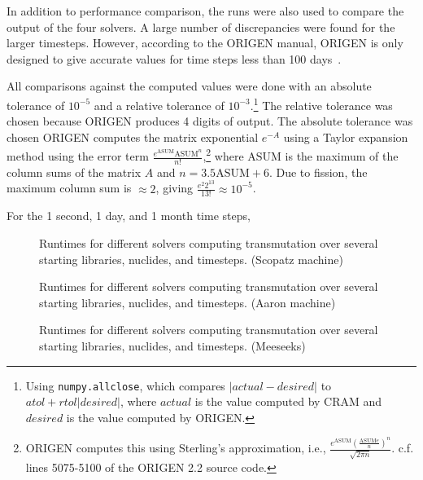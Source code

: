 In addition to performance comparison, the runs were also used to compare the
output of the four solvers. A large number of discrepancies were found for the
larger timesteps. However, according to the ORIGEN manual, ORIGEN is only
designed to give accurate values for time steps less than 100
days~\cite{ationneeded}.

All comparisons against the computed values were done with an absolute
tolerance of $10^{-5}$ and a relative tolerance of $10^{-3}$.\footnote{Using
  \texttt{numpy.\allowbreak{}allclose}, which compares $|actual -
  desired|$ to $atol + rtol|desired|$,
  where $actual$ is the value computed by CRAM and $desired$ is the
  value computed by ORIGEN.} The relative tolerance was chosen because ORIGEN
produces 4 digits of output. The absolute tolerance was chosen ORIGEN computes
the matrix exponential $e^{-A}$ using a Taylor expansion method using the error term
$\frac{e^{\mathrm{ASUM}}\mathrm{ASUM}^n}{n!}$,\footnote{ORIGEN computes this using
    Sterling's approximation, i.e.,
    $\frac{e^{\mathrm{ASUM}}(\frac{\mathrm{ASUM}e}{n})^n}{\sqrt{2\pi
      n}}$. c.f. lines 5075-5100 of the ORIGEN 2.2 source code.} where
$\mathrm{ASUM}$ is the maximum of the column sums of the matrix $A$ and $n =
3.5\mathrm{ASUM} + 6$. Due to fission, the maximum
column sum is $\approx 2$, giving $\frac{e^{2}2^{13}}{13!}\approx 10^{-5}$.

For the 1 second, 1 day, and 1 month time steps,



\begin{figure}[!ht]
\centering
\resizebox{0.9\textwidth}{!}{}
\caption{Runtimes for different solvers computing transmutation over several starting libraries, nuclides, and timesteps.
(Scopatz machine)}
\label{fig:origen-scopatz}
\end{figure}

\begin{figure}[!ht]
\centering
\resizebox{0.9\textwidth}{!}{}
\caption{Runtimes for different solvers computing transmutation over several starting libraries, nuclides, and timesteps.
 (Aaron machine)}
\label{fig:origen-aaron}
\end{figure}

\begin{figure}[!ht]
\centering
\resizebox{0.9\textwidth}{!}{}
\caption{Runtimes for different solvers computing transmutation over several starting libraries, nuclides, and timesteps.
 (Meeseeks)}
\label{fig:origen-meeseeks}
\end{figure}
